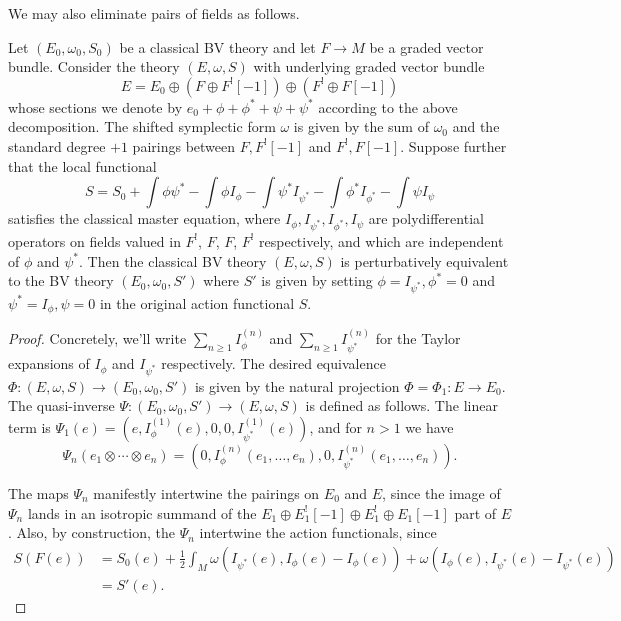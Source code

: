 \documentclass[10pt, oneside]{article}
\begin{document}
We may also eliminate pairs of fields as follows.

\begin{prop} 
\label{prop:BRSTdoublet}
Let $(E_0, \omega_0, S_0)$ be a classical BV theory and let $F \to M$ be a graded vector bundle.
Consider the theory $(E, \omega, S)$ with underlying graded vector bundle
\[
E = E_0 \oplus \left(F \oplus F^! [-1]\right) \oplus \left(F^! \oplus F[-1] \right)
\]
whose sections we denote by $e_0 + \phi + \phi^* + \psi + \psi^*$ according to the above decomposition. 
The shifted symplectic form $\omega$ is given by the sum of $\omega_0$ and the standard degree $+1$ pairings between $F, F^! [-1]$ and $F^!, F[-1]$. 
Suppose further that the local functional
\[
S = S_0 + \int \phi \psi^* - \int \phi I_\phi - \int \psi^* I_{\psi^*} - \int \phi^* I_{\phi^*} - \int \psi I_{\psi}
\]
satisfies the classical master equation, where $I_{\phi}, I_{\psi^*}, I_{\phi^*}, I_{\psi}$ are polydifferential operators on fields valued in $F^!$, $F$, $F$, $F^!$ respectively, and which are independent of $\phi$ and $\psi^*$.
Then the classical BV theory $(E, \omega, S)$ is perturbatively equivalent to the BV theory $(E_0, \omega_0, S')$ where $S'$ is given by setting $\phi = I_{\psi^*}, \phi^* = 0$ and $\psi^* = I_{\phi}, \psi = 0$ in the original action functional $S$. 
\end{prop}
\begin{proof}
Concretely, we'll write $\sum_{n \ge 1} I^{(n)}_\phi$ and $\sum_{n \ge 1} I^{(n)}_{\psi^*}$ for the Taylor expansions of $I_\phi$ and $I_{\psi^*}$ respectively.  
The desired equivalence $\Phi \colon (E, \omega, S) \to (E_0, \omega_0, S')$ is given by the natural projection $\Phi = \Phi_1 \colon E \to E_0$. 
The quasi-inverse $\Psi \colon (E_0, \omega_0, S') \to (E, \omega, S)$ is defined as follows.
The linear term is $\Psi_1(e) = (e, I^{(1)}_{\phi}(e),0,0, I^{(1)}_{\psi^*}(e))$, and for $n > 1$ we have 
\[\Psi_n(e_1\otimes \cdots \otimes e_n) = (0, I^{(n)}_{\phi}(e_1, \ldots, e_n), 0, I^{(n)}_{\psi^*}(e_1, \ldots, e_n)).\]

The maps $\Psi_n$ manifestly intertwine the pairings on $E_0$ and $E$, since the image of $\Psi_n$ lands in an isotropic summand of the $E_1\oplus E_1^![-1]\oplus E_1^!\oplus E_1[-1]$ part of $E$.  
Also, by construction, the $\Psi_n$ intertwine the action functionals, since
\begin{align*}
S(F(e)) &= S_0(e) + \frac{1}{2} \int_M \omega(I_{\psi^*}(e), I_\phi(e) - I_\phi(e)) + \omega(I_\phi (e), I_{\psi^*}(e) - I_{\psi^*}(e)) \\
&= S'(e).
\end{align*}
\end{proof}
\end{document}
